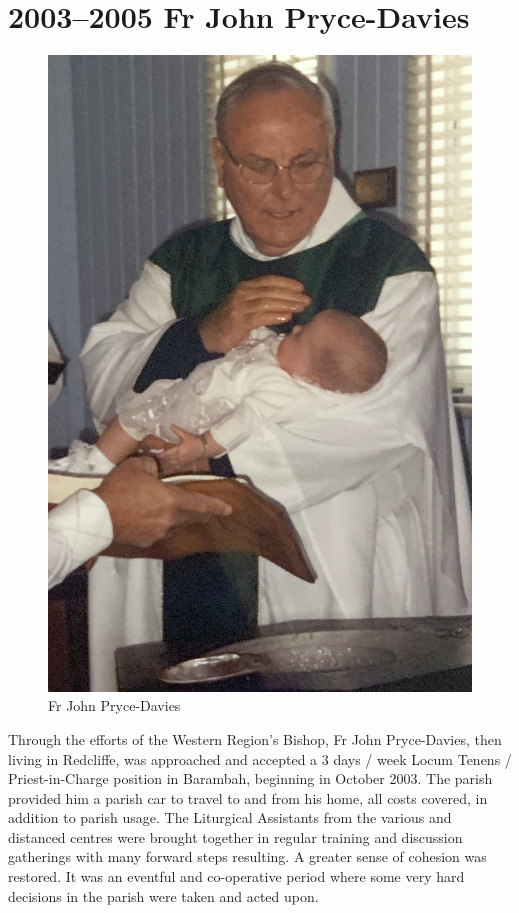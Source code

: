 \section{2003--2005 Fr John Pryce-Davies}









\begin{figure}
\begin{center}
\includegraphics[width=.8\linewidth,center]{../images/JohnPryceDaviesWessling.jpg}
\caption{Fr John Pryce-Davies}
\end{center}
\end{figure}




Through the efforts of the Western Region's Bishop, Fr John Pryce-Davies, then living in Redcliffe, was approached and accepted a 3 days / week Locum Tenens / Priest-in-Charge position in Barambah, beginning in October 2003. The parish provided him a parish car to travel to and from his home, all costs covered, in addition to parish usage. The Liturgical Assistants from the various and distanced centres were brought together in regular training and discussion gatherings with many forward steps resulting. A greater sense of cohesion was restored. It was an eventful and co-operative period where some very hard decisions in the parish were taken and acted upon.










